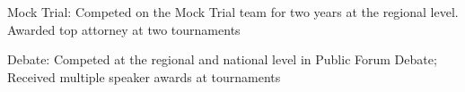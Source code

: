\vspace{-5pt}
\begin{cvhonors}
\vspace{-20pt}
  \cvhonor
    {Mock Trial:}
    {Competed on the Mock Trial team for two years at the regional level. Awarded top attorney at two tournaments }
    
\vspace{-18pt}
    
  \cvhonor
    {Debate:}
    {Competed at the regional and national level in Public Forum Debate; Received multiple speaker awards at tournaments}
\end{cvhonors}


